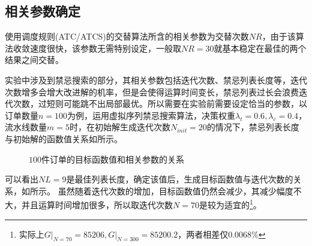 \subsection{相关参数确定}
使用调度规则(ATC/ATCS)的交替算法所含的相关参数为交替次数$NR$，由于该算法收敛速度很快，该参数无需特别设定，一般取$NR = 30$就基本稳定在最佳的两个结果之间交替。

实验中涉及到禁忌搜索的部分，其相关参数包括迭代次数、禁忌列表长度等，迭代次数增多会增大改进解的机率，但是会使得运算时间变长，禁忌列表过长会浪费迭代次数，过短则可能跳不出局部最优。所以需要在实验前需要设定恰当的参数，以订单数量$n = 100$为例，运用虚拟序列禁忌搜索算法，决策权重$\lambda_t =0.6, \lambda_c = 0.4$，流水线数量$m = 5$时，在初始解生成迭代次数$N_{init} = 20$的情况下，禁忌列表长度与初始解的函数值关系如所示。
\begin{figure}[h]
\centering
\subfloat[禁忌列表长度]{\texttt{[image: NL\_100]}\label{fig:100NLwithGoal}}
\subfloat[迭代次数]{\texttt{[image: N\_100]}\label{fig:100NwithGoal}}
\caption{$100$件订单的目标函数值和相关参数的关系}
\end{figure}

可以看出$NL = 9$是最佳列表长度，确定该值后，生成目标函数值与迭代次数的关系，如所示。
虽然随着迭代次数的增加，目标函数值仍然会减少，其减少幅度不大，并且运算时间增加很多，所以取迭代次数$N = 70$是较为适宜的\footnote{实际上$\left. G\right|_{N=70} = 85206, \left. G\right|_{N=300} = 85200.2$，两者相差仅$0.0068\%$}。

